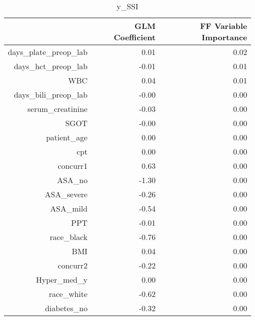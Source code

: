 \begin{table}[ht]
\centering
\begin{tabular}{rrr}
  \hline
 & GLM Coefficient & FF Variable Importance \\ 
  \hline
days\_plate\_preop\_lab & 0.01 & 0.02 \\ 
  days\_hct\_preop\_lab & -0.01 & 0.01 \\ 
  WBC & 0.04 & 0.01 \\ 
  days\_bili\_preop\_lab & -0.00 & 0.00 \\ 
  serum\_creatinine & -0.03 & 0.00 \\ 
  SGOT & -0.00 & 0.00 \\ 
  patient\_age & 0.00 & 0.00 \\ 
  cpt & 0.00 & 0.00 \\ 
  concurr1 & 0.63 & 0.00 \\ 
  ASA\_no & -1.30 & 0.00 \\ 
  ASA\_severe & -0.26 & 0.00 \\ 
  ASA\_mild & -0.54 & 0.00 \\ 
  PPT & -0.01 & 0.00 \\ 
  race\_black & -0.76 & 0.00 \\ 
  BMI & 0.04 & 0.00 \\ 
  concurr2 & -0.22 & 0.00 \\ 
  Hyper\_med\_y & 0.00 & 0.00 \\ 
  race\_white & -0.62 & 0.00 \\ 
  diabetes\_no & -0.32 & 0.00 \\ 
   \hline
\end{tabular}
\caption{y_SSI} 
\end{table}

